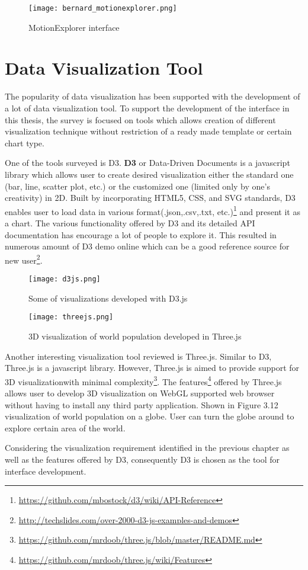 \begin{figure}
\centering
\texttt{[image: bernard\_motionexplorer.png]}
\caption{MotionExplorer interface}
\end{figure}

\section{Data Visualization Tool}

The popularity of data visualization has been supported with the development of a lot of data visualization tool. To support the development of the interface in this thesis, the survey is focused on tools which allows creation of different visualization technique without restriction of a ready made template or certain chart type. 

One of the tools surveyed is D3\cite{bostock}. \textbf{D3} or Data-Driven Documents is a javascript library which allows user to create desired visualization either the standard one (bar, line, scatter plot, etc.) or the customized one (limited only by one's creativity) in 2D. Built by incorporating HTML5, CSS, and SVG standards, D3 enables user to load data in various format(.json,.csv,.txt, etc.)\footnote{\url{https://github.com/mbostock/d3/wiki/API-Reference}} and present it as a chart. The various functionality offered by D3 and its detailed API documentation has encourage a lot of people to explore it. This resulted in numerous amount of D3 demo online which can be a good reference source for new user\footnote{\url{http://techslides.com/over-2000-d3-js-examples-and-demos}}.

\begin{figure}
\centering
\texttt{[image: d3js.png]}
\caption{Some of visualizations developed with D3.js}
\end{figure}

\begin{figure}
\centering
\texttt{[image: threejs.png]}
\caption{3D visualization of world population developed in Three.js}
\end{figure}

Another interesting visualization tool reviewed is Three.js. Similar to D3, Three.js is a javascript library. However, Three.js is aimed to provide support for 3D visualizationwith minimal complexity\footnote{\url{https://github.com/mrdoob/three.js/blob/master/README.md}}. The features\footnote{\url{https://github.com/mrdoob/three.js/wiki/Features}} offered by Three.js allows user to develop 3D visualization on WebGL supported web browser without having to install any third party application. Shown in Figure 3.12 visualization of world population on a globe. User can turn the globe around to explore certain area of the world.

Considering the visualization requirement identified in the previous chapter as well as the features offered by D3, consequently D3 is chosen as the tool for interface development.




